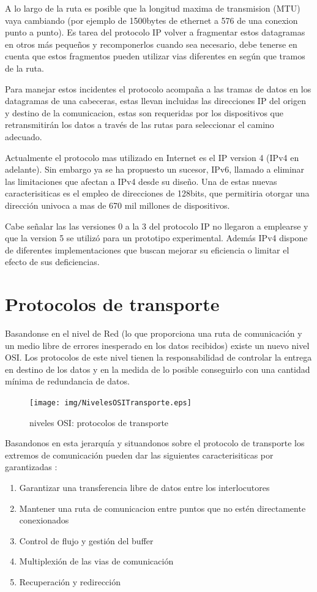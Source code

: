 \documentclass[a4paper,spanish,12pt]{book}
\begin{document}
A lo largo de la ruta es posible que la longitud maxima de transmision (MTU) vaya cambiando (por ejemplo de 1500bytes de ethernet a 576 de una conexion punto a punto). Es tarea del protocolo IP volver a fragmentar estos datagramas en otros más pequeños y recomponerlos cuando sea necesario, debe tenerse en cuenta que estos fragmentos pueden utilizar vias diferentes en según que tramos de la ruta.

Para manejar estos incidentes el protocolo acompaña a las tramas de datos en los datagramas de una cabeceras, estas llevan incluidas las direcciones IP del origen y destino de la comunicacion, estas son requeridas por los dispositivos que retransmitirán los datos a trav\'es de las rutas para seleccionar el camino adecuado.

Actualmente el protocolo mas utilizado en Internet es el IP version 4 (IPv4 en adelante). Sin embargo ya se ha propuesto un sucesor, IPv6, llamado a eliminar las limitaciones que afectan a IPv4 desde su diseño. Una de estas nuevas caracterisiticas es el empleo de direcciones de 128bits, que permitiria otorgar una dirección univoca a mas de 670 mil millones de dispositivos. 

Cabe señalar las las versiones 0 a la 3 del protocolo IP no llegaron a emplearse  y que la version 5 se utilizó para un prototipo experimental. Además IPv4 dispone de diferentes implementaciones que buscan mejorar su eficiencia o limitar el efecto de sus deficiencias.

\section{Protocolos de transporte}

Basandonse en el nivel de Red (lo que proporciona una ruta de comunicación y un medio libre de errores inesperado en los datos recibidos) existe un nuevo nivel OSI. Los protocolos de este nivel tienen la responsabilidad de controlar la entrega en destino de los datos y en la medida de lo posible conseguirlo con una cantidad mínima de redundancia de datos.

\begin{figure}
	\texttt{[image: img/NivelesOSITransporte.eps]}	
              \caption{niveles OSI: protocolos de transporte}
  \label{fig:nivelesOSITransporte}
\end{figure}

Basandonos en esta jerarquía y situandonos sobre el protocolo de transporte los extremos de comunicación pueden dar las siguientes caracterisiticas por garantizadas :
\begin{enumerate}
	\item{Garantizar una transferencia libre de datos entre los interlocutores}
	\item{Mantener una ruta de comunicacion entre puntos que no est\'en directamente conexionados}
	\item{Control de flujo y gestión del buffer}
	\item{Multiplexión de las vias de comunicación}
	\item{Recuperación y redirección}
\end{enumerate}
\end{document}
